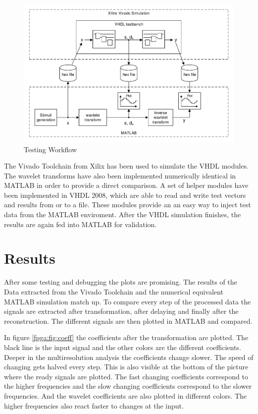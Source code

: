 \begin{refsection}
\begin{figure}
	\centering
	\includegraphics[width=\textwidth]{papers/fpga/images/vhdl_sim.pdf}
	\caption{Testing Workflow \label{fpga:fig:testing}}
\end{figure}

The Vivado Toolchain from Xilix has been used to simulate the VHDL modules.
The wavelet transforms have also been implemented numerically identical in MATLAB in order to provide a direct comparison. 
A set of helper modules have been implemented in VHDL 2008, which are able to read and write test vectors and results from or to a file.
These modules provide an an easy way to inject test data from the MATLAB enviroment.
After the VHDL simulation finishes, the results are again fed into MATLAB for validation.

\section{Results}

After some testing and debugging the plots are promising.
The results of the Data extracted from the Vivado Toolchain and the numerical equivalent MATLAB simulation match up.
To compare every step of the processed data the signals are extracted after transformation, after delaying and finally after the reconstruction.
The different signals are then plotted in MATLAB and compared.

In figure \ref{fpga:fig:coeff} the coefficients after the transformation are plotted.
The black line is the input signal and the other colors are the different coefficients.
Deeper in the multiresolution analysis the coefficients change slower. The speed of changing gets halved every step. 
This is also visible at the bottom of the picture where the ready signals are plotted.
The fast changing coefficients correspond to the higher frequencies and the slow changing coefficients correspond to the slower frequencies.
And the wavelet coefficients are also plotted in different colors. 
The higher frequencies also react faster to changes at the input.


\end{refsection}
